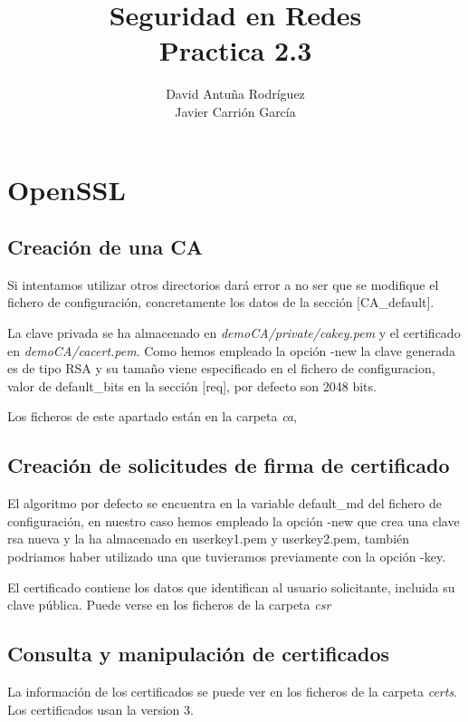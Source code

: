 \documentclass[11pt]{article}
\title{\Large Seguridad en Redes\\Practica 2.3}
\author{David Antuña Rodríguez\\Javier Carrión García}
\date{}
\begin{document}
  \raggedright

  \maketitle
  \newpage

  \section{OpenSSL}
    \subsection{Creación de una CA}
      \par
      Si intentamos utilizar otros directorios dará error a no ser que se modifique el fichero de
      configuración, concretamente los datos de la sección [CA\_default].

      \bigskip
      \par
      La clave privada se ha almacenado en \textit{demoCA/private/cakey.pem} y el certificado en
      \textit{demoCA/cacert.pem}. Como hemos empleado la opción -new la clave generada es de tipo
      RSA y su tamaño viene especificado en el fichero de configuracion, valor de default\_bits
      en la sección [req], por defecto son 2048 bits.

      \bigskip
      \par
      Los ficheros de este apartado están en la carpeta \textit{ca},

    \subsection{Creación de solicitudes de firma de certificado}
      \par
      El algoritmo por defecto se encuentra en la variable default\_md del fichero de configuración,
      en nuestro caso hemos empleado la opción -new que crea una clave rsa nueva y la ha almacenado
      en userkey1.pem y userkey2.pem, también podriamos haber utilizado una que tuvieramos
      previamente con la opción -key.

      \bigskip
      \par
      El certificado contiene los datos que identifican al usuario solicitante, incluida
      su clave pública. Puede verse en los ficheros de la carpeta \textit{csr}

    \subsection{Consulta y manipulación de certificados}
      \par
      La información de los certificados se puede ver en los ficheros de la carpeta \textit{certs}. Los
      certificados usan la version 3.
\end{document}
